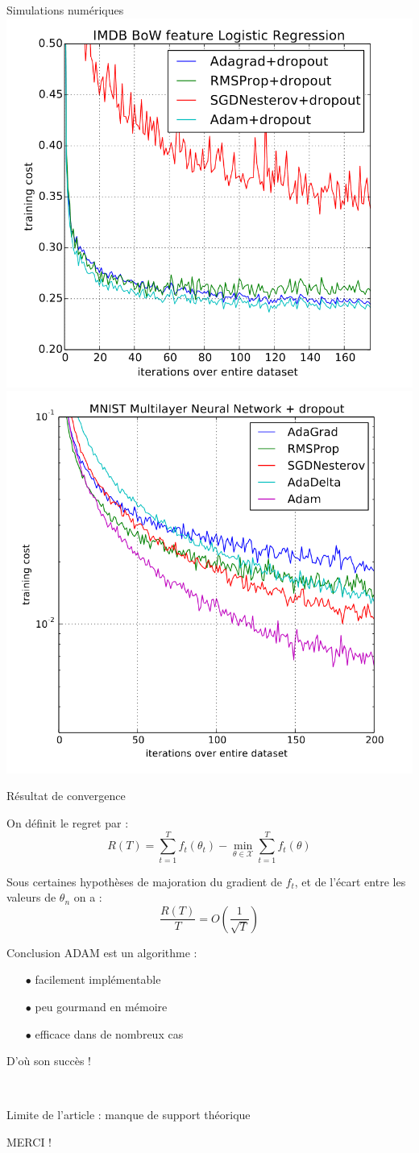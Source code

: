 \documentclass[11pt,aspectratio=169,xcolor=dvipsnames, french]{beamer}
\begin{document}
\begin{frame}{Simulations numériques}
 \includegraphics[width=0.45\linewidth]{../Images/IMDB_article.png}\hfill 
 \includegraphics[width=0.45\linewidth]{../Images/Multilayer.png} 
\end{frame}


\begin{frame}{Résultat de convergence}

On définit le regret par : $$R(T)=\sum_{t=1}^{T}f_t(\theta_t)-\min_{\theta\in\mathcal{X}}\sum_{t=1}^{T}f_t(\theta)$$

\begin{theorem}
  Sous certaines hypothèses de majoration du gradient de $f_t$, et de l'écart entre les valeurs de $\theta_n$ on a : 
    $$\frac{R(T)}{T}=O\left(\frac{1}{\sqrt{T}}\right)$$  
\end{theorem}

\end{frame}



\begin{frame}{Conclusion}
ADAM est un algorithme :  

\begin{itemize}
\item[$\bullet$] facilement implémentable 
\item[$\bullet$] peu gourmand en mémoire
\item[$\bullet$] efficace dans de nombreux cas
\end{itemize}

D'où son succès !

\

Limite de l'article : manque de support théorique

\end{frame}

\begin{frame}{}
\begin{center}
 \huge MERCI !
 \end{center}
\end{frame}
\end{document}

